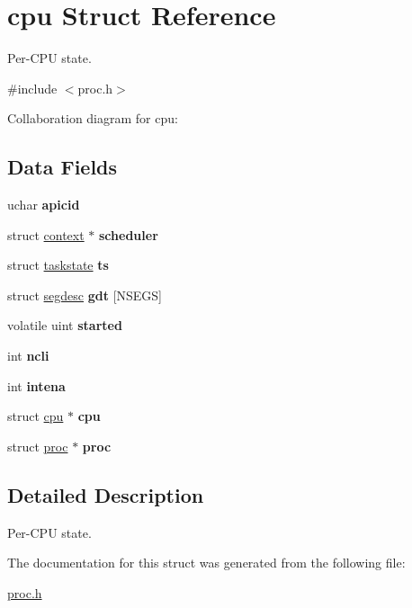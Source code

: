 \hypertarget{structcpu}{}\section{cpu Struct Reference}
\label{structcpu}


Per-\/\+C\+PU state.  




{\ttfamily \#include $<$proc.\+h$>$}



Collaboration diagram for cpu\+:
\subsection*{Data Fields}
\begin{DoxyCompactItemize}
\item 
\mbox{\label{structcpu_ad08a3478ec15fc8bec1d9b6b5a0431db}} 
uchar {\bfseries apicid}
\item 
\mbox{\label{structcpu_aaa1510fdf8a2230c033d04e13e4fdd9e}} 
struct \mbox{\hyperlink{structcontext}{context}} $\ast$ {\bfseries scheduler}
\item 
\mbox{\label{structcpu_a32e7b5aa877171c943d47038e818a159}} 
struct \mbox{\hyperlink{structtaskstate}{taskstate}} {\bfseries ts}
\item 
\mbox{\label{structcpu_aee38fb8832f8e728538b2cee877d1c09}} 
struct \mbox{\hyperlink{structsegdesc}{segdesc}} {\bfseries gdt} \mbox{[}N\+S\+E\+GS\mbox{]}
\item 
\mbox{\label{structcpu_a869f6e0e1dbf69de0bdb3546f981847f}} 
volatile uint {\bfseries started}
\item 
\mbox{\label{structcpu_a9ccad8ae031c295f86e96de26df24805}} 
int {\bfseries ncli}
\item 
\mbox{\label{structcpu_a26fc271fea8af30d67fc2ae22ef0a82f}} 
int {\bfseries intena}
\item 
\mbox{\label{structcpu_a96823491c316b96bdd2fb80fa8e270f9}} 
struct \mbox{\hyperlink{structcpu}{cpu}} $\ast$ {\bfseries cpu}
\item 
\mbox{\label{structcpu_a9e71a6265904fd644875a9ea5a413c89}} 
struct \mbox{\hyperlink{structproc}{proc}} $\ast$ {\bfseries proc}
\end{DoxyCompactItemize}


\subsection{Detailed Description}
Per-\/\+C\+PU state. 

The documentation for this struct was generated from the following file\+:\begin{DoxyCompactItemize}
\item 
\mbox{\hyperlink{proc_8h}{proc.\+h}}\end{DoxyCompactItemize}
